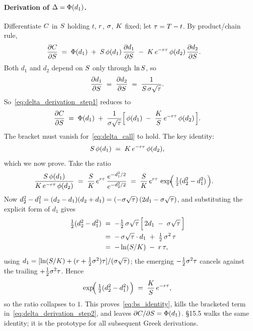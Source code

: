 \paragraph{Derivation of $\Delta = \Phi(d_1)$.}
Differentiate $C$ in $S$ holding $t$, $r$, $\sigma$,
$K$ fixed; let $\tau = T - t$. By product/chain rule,
\begin{align}
  \frac{\partial C}{\partial S}
    \;&=\; \Phi(d_1)
       \;+\; S\,\phi(d_1)\,\frac{\partial d_1}{\partial S}
       \;-\; K\,e^{-r \tau}\,\phi(d_2)\,\frac{\partial d_2}{\partial S}.
  \label{eq:delta_derivation_step1}
\end{align}
Both $d_1$ and $d_2$ depend on $S$ only through $\ln S$, so
\begin{equation*}
  \frac{\partial d_1}{\partial S}
  \;=\; \frac{\partial d_2}{\partial S}
  \;=\; \frac{1}{S\,\sigma\sqrt{\tau}}.
\end{equation*}
So~\eqref{eq:delta_derivation_step1} reduces to
\begin{equation}
  \frac{\partial C}{\partial S}
    \;=\; \Phi(d_1)
       \;+\; \frac{1}{\sigma\sqrt{\tau}}
              \Bigl[\,\phi(d_1) \;-\; \frac{K}{S}\,e^{-r \tau}\,\phi(d_2)\,\Bigr].
  \label{eq:delta_derivation_step2}
\end{equation}
The bracket must vanish for~\eqref{eq:delta_call} to hold. The key
identity:
\begin{equation}
  S\,\phi(d_1) \;=\; K\,e^{-r \tau}\,\phi(d_2),
  \label{eq:bs_identity}
\end{equation}
which we now prove. Take the ratio
\begin{align*}
  \frac{S\,\phi(d_1)}{K\,e^{-r \tau}\,\phi(d_2)}
   \;&=\; \frac{S}{K}\,e^{r \tau}\,
          \frac{e^{-d_1^2/2}}{e^{-d_2^2/2}}
   \;=\; \frac{S}{K}\,e^{r \tau}\,
          \exp\!\Bigl(\,\tfrac{1}{2}(d_2^2 - d_1^2)\,\Bigr).
\end{align*}
Now $d_2^2 - d_1^2 = (d_2 - d_1)(d_2 + d_1) = (-\sigma\sqrt\tau)
\,(2 d_1 - \sigma\sqrt\tau)$, and substituting the explicit form of
$d_1$ gives
\begin{align*}
  \tfrac{1}{2}(d_2^2 - d_1^2)
   \;&=\; -\tfrac{1}{2}\,\sigma\sqrt\tau\,
          \Bigl[\, 2 d_1 \;-\; \sigma\sqrt\tau \,\Bigr] \\
   \;&=\; -\,\sigma\sqrt\tau \cdot d_1 \;+\; \tfrac{1}{2}\,\sigma^2\,\tau \\
   \;&=\; -\ln(S/K) \;-\; r\,\tau,
\end{align*}
using $d_1 = [\ln(S/K) + (r + \tfrac12\sigma^2)\tau]
/(\sigma\sqrt\tau)$; the emerging $-\tfrac12\sigma^2\tau$ cancels
against the trailing $+\tfrac12\sigma^2\tau$. Hence
\begin{equation*}
  \exp\!\Bigl(\,\tfrac{1}{2}(d_2^2 - d_1^2)\,\Bigr)
   \;=\; \frac{K}{S}\,e^{-r \tau},
\end{equation*}
so the ratio collapses to $1$. This proves~\eqref{eq:bs_identity},
kills the bracketed term in~\eqref{eq:delta_derivation_step2}, and
leaves $\partial C / \partial S = \Phi(d_1)$. \citeHull
\S15.5 walks the same identity; it is the prototype for all
subsequent Greek derivations.

